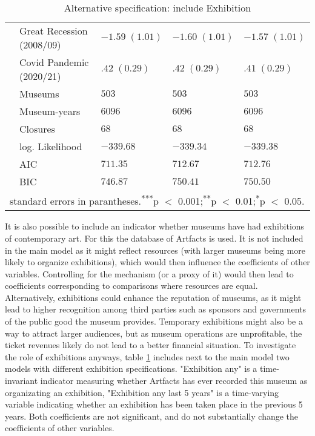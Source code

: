 \documentclass[12pt]{article}
\begin{document}
\begin{table}[ht]
\begin{tabular}{p{0mm}llll}
   & Great Recession (2008/09) & $-1.59 \; (1.01)$ & $-1.60 \; (1.01)$ & $-1.57 \; (1.01)$ \\ 
   & Covid Pandemic (2020/21) & $.42 \; (0.29)$ & $.42 \; (0.29)$ & $.41 \; (0.29)$ \\ 
   \hline
 & Museums & $503$ & $503$ & $503$ \\ 
   & Museum-years & $6096$ & $6096$ & $6096$ \\ 
   & Closures & $68$ & $68$ & $68$ \\ 
   & log. Likelihood & $-339.68$ & $-339.34$ & $-339.38$ \\ 
   & AIC & $711.35$ & $712.67$ & $712.76$ \\ 
   & BIC & $746.87$ & $750.41$ & $750.50$ \\ 
   \hline 
 \multicolumn{5}{l}{\footnotesize{standard errors in parantheses.\textsuperscript{***}p $<$ 0.001;\textsuperscript{**}p $<$ 0.01;\textsuperscript{*}p $<$ 0.05.}}
\end{tabular}
\caption{Alternative specification: include Exhibition} 
\label{tbl:t_reg_coxph_af}
\end{table}

It is also possible to include an indicator whether museums have had exhibitions of contemporary art.
For this the database of Artfacts is used.
It is not included in the main model as it might reflect resources (with larger museums being more likely to organize exhibitions), which would then influence the coefficients of other variables. 
Controlling for the mechanism (or a proxy of it) would then lead to coefficients corresponding to comparisons where resources are equal.
Alternatively, exhibitions could enhance the reputation of museums, as it might lead to higher recognition among third parties such as sponsors and governments of the public good the museum provides.
Temporary exhibitions might also be a way to attract larger audiences, but as museum operations are unprofitable, the ticket revenues likely do not lead to a better financial situation.
To investigate the role of exhibitions anyways, table \ref{tbl:t_reg_coxph_af} includes next to the main model two models with different exhibition specifications.
"Exhibition any" is a time-invariant indicator measuring whether Artfacts has ever recorded this museum as organizating an exhibition, "Exhibition any last 5 years" is a time-varying variable indicating whether an exhibition has been taken place in the previous 5 years.
Both coefficients are not significant, and do not substantially change the coefficients of other variables. 
\end{document}
